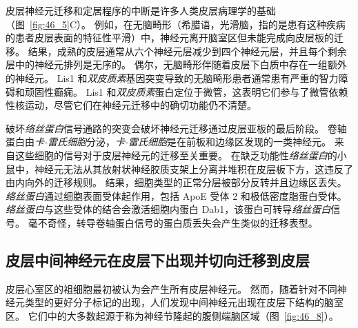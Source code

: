 皮层神经元迁移和定居程序的中断是许多人类皮层病理学的基础（图~\ref{fig:46_5}C）。
例如，在无脑畸形（希腊语，光滑脑，指的是患有这种疾病的患者皮层表面的特征性平滑）中，神经元离开脑室区但未能完成向皮层板的迁移。
结果，成熟的皮层通常从六个神经元层减少到四个神经元层，并且每个剩余层中的神经元排列是无序的。
偶尔，无脑畸形伴随着皮层下白质中存在一组额外的神经元。
Lis1 和\textit{双皮质素}基因突变导致的无脑畸形患者通常患有严重的智力障碍和顽固性癫痫。
Lis1 和\textit{双皮质素}蛋白定位于微管，这表明它们参与了微管依赖性核运动，尽管它们在神经元迁移中的确切功能仍不清楚。


破坏\textit{络丝蛋白}信号通路的突变会破坏神经元迁移通过皮层亚板的最后阶段。
卷轴蛋白由\textit{卡-雷氏细胞}分泌，\textit{卡-雷氏细胞}是在前板和边缘区发现的一类神经元。
来自这些细胞的信号对于皮层神经元的迁移至关重要。
在缺乏功能性\textit{络丝蛋白}的小鼠中，神经元无法从其放射状神经胶质支架上分离并堆积在皮层板下方，这违反了由内向外的迁移规则。
结果，细胞类型的正常分层被部分反转并且边缘区丢失。
\textit{络丝蛋白}通过细胞表面受体起作用，包括 ApoE 受体 2 和极低密度脂蛋白受体。
\textit{络丝蛋白}与这些受体的结合会激活细胞内蛋白 Dab1，该蛋白可转导\textit{络丝蛋白}信号。
毫不奇怪，转导卷轴蛋白信号的蛋白质丢失会产生类似的迁移表型。



\subsection{皮层中间神经元在皮层下出现并切向迁移到皮层}

皮层心室区的祖细胞最初被认为会产生所有皮层神经元。
然而，随着针对不同神经元类型的更好分子标记的出现，人们发现中间神经元出现在皮层下结构的脑室区。
它们中的大多数起源于称为神经节隆起的腹侧端脑区域（图~\ref{fig:46_8}）。


